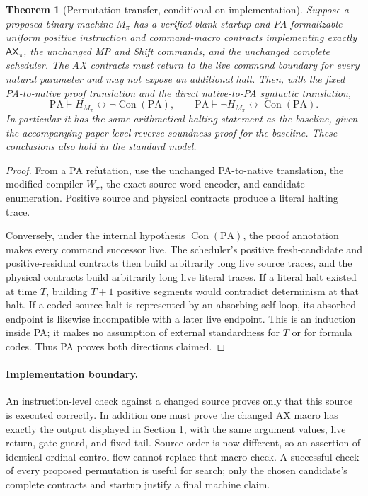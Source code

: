 \documentclass[10pt]{article}
\newtheorem{theorem}{Theorem}
\newcommand{\PA}{\mathrm{PA}}
\newcommand{\Ax}{\mathsf{AX}}
\begin{document}
\begin{theorem}[Permutation transfer, conditional on implementation]
Suppose a proposed binary machine $M_\pi$ has a verified blank
startup and PA-formalizable uniform positive instruction and
command-macro contracts implementing exactly $\Ax_\pi$, the
unchanged MP and Shift commands, and the unchanged complete
scheduler.  The AX contracts must return to the live command
boundary for every natural parameter and may not expose an
additional halt.  Then, with the fixed PA-to-native proof
translation and the direct native-to-PA syntactic translation,
\[
 \PA\vdash H_{M_\pi}\leftrightarrow\neg\operatorname{Con}(\PA),
 \qquad
 \PA\vdash\neg H_{M_\pi}\leftrightarrow\operatorname{Con}(\PA).
\]
In particular it has the same arithmetical halting statement as
the baseline, given the accompanying paper-level reverse-soundness
proof for the baseline.  These conclusions also hold in the
standard model.
\end{theorem}
\begin{proof}
From a PA refutation, use the unchanged PA-to-native translation,
the modified compiler $W_\pi$, the exact source word encoder,
and candidate enumeration.  Positive source and physical
contracts produce a literal halting trace.

Conversely, under the internal hypothesis $\operatorname{Con}(\PA)$,
the proof annotation makes every command successor live.
The scheduler's positive fresh-candidate and positive-residual
contracts then build arbitrarily long live source traces, and
the physical contracts build arbitrarily long live literal traces.
If a literal halt existed at time $T$, building $T+1$ positive
segments would contradict determinism at that halt.  If a coded
source halt is represented by an absorbing self-loop, its absorbed
endpoint is likewise incompatible with a later live endpoint.
This is an induction inside PA; it makes no assumption of external
standardness for $T$ or for formula codes.  Thus PA proves both
directions claimed.
\end{proof}

\paragraph{Implementation boundary.}
An instruction-level check against a changed source proves only
that this source is executed correctly.  In addition one must
prove the changed AX macro has exactly the output displayed in
Section 1, with the same argument values, live return, gate guard,
and fixed tail.  Source order is now different, so an assertion of
identical ordinal control flow cannot replace that macro check.
A successful check of every proposed permutation is useful for
search; only the chosen candidate's complete contracts and startup
justify a final machine claim.
\end{document}
